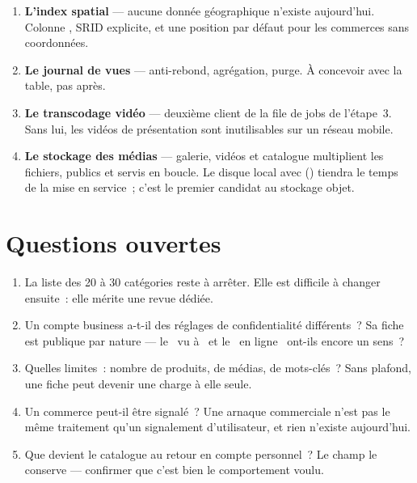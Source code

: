 \begin{enumerate}[leftmargin=1.6em]
  \item \textbf{L'index spatial} --- aucune donnée géographique n'existe aujourd'hui. Colonne
        , SRID explicite, et une position par défaut pour les commerces sans
        coordonnées.
  \item \textbf{Le journal de vues} --- anti-rebond, agrégation, purge. À concevoir avec la
        table, pas après.
  \item \textbf{Le transcodage vidéo} --- deuxième client de la file de jobs de l'étape~3.
        Sans lui, les vidéos de présentation sont inutilisables sur un réseau mobile.
  \item \textbf{Le stockage des médias} --- galerie, vidéos et catalogue multiplient les
        fichiers, publics et servis en boucle. Le disque local avec 
        () tiendra le temps de la mise en service~; c'est le
        premier candidat au stockage objet.
\end{enumerate}

\section{Questions ouvertes}

\begin{enumerate}[leftmargin=1.6em]
  \item La liste des 20 à 30 catégories reste à arrêter. Elle est difficile à changer
        ensuite~: elle mérite une revue dédiée.
  \item Un compte business a-t-il des réglages de confidentialité différents~? Sa fiche est
        publique par nature --- le \guillemotleft~vu à~\guillemotright{} et le
        \guillemotleft~en ligne~\guillemotright{} ont-ils encore un sens~?
  \item Quelles limites~: nombre de produits, de médias, de mots-clés~? Sans plafond, une
        fiche peut devenir une charge à elle seule.
  \item Un commerce peut-il être signalé~? Une arnaque commerciale n'est pas le même
        traitement qu'un signalement d'utilisateur, et rien n'existe aujourd'hui.
  \item Que devient le catalogue au retour en compte personnel~? Le champ
         le conserve --- confirmer que c'est bien le comportement voulu.
\end{enumerate}
